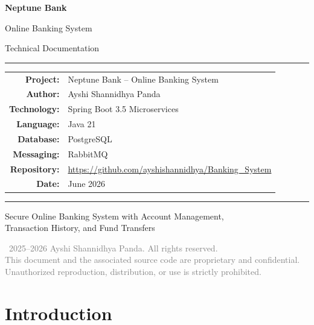 \documentclass[12pt,a4paper]{report}
\begin{document}
\begin{titlepage}
    \centering
    \vspace*{2cm}
    {\Huge\bfseries\textcolor{neptuneblue}{Neptune Bank}\par}
    \vspace{0.5cm}
    {\LARGE\textcolor{neptuneblue!70}{Online Banking System}\par}
    \vspace{1cm}
    {\Large Technical Documentation\par}
    \vspace{2cm}
    \rule{\textwidth}{1pt}
    \vspace{0.5cm}
    {\large
    \begin{tabular}{rl}
        \textbf{Project:} & Neptune Bank -- Online Banking System \\
        \textbf{Author:} & Ayshi Shannidhya Panda \\
        \textbf{Technology:} & Spring Boot 3.5 Microservices \\
        \textbf{Language:} & Java 21 \\
        \textbf{Database:} & PostgreSQL \\
        \textbf{Messaging:} & RabbitMQ \\
        \textbf{Repository:} & \url{https://github.com/ayshishannidhya/Banking_System} \\
        \textbf{Date:} & June 2026 \\
    \end{tabular}
    }
    \vspace{0.5cm}
    \rule{\textwidth}{1pt}
    \vfill
    {\large Secure Online Banking System with Account Management,\\Transaction History, and Fund Transfers\par}
    \vspace{1cm}
    {\footnotesize\textcolor{gray}{\textcopyright\ 2025--2026 Ayshi Shannidhya Panda. All rights reserved.\\This document and the associated source code are proprietary and confidential.\\Unauthorized reproduction, distribution, or use is strictly prohibited.}}
\end{titlepage}

\tableofcontents
\newpage

\chapter{Introduction}
\end{document}
